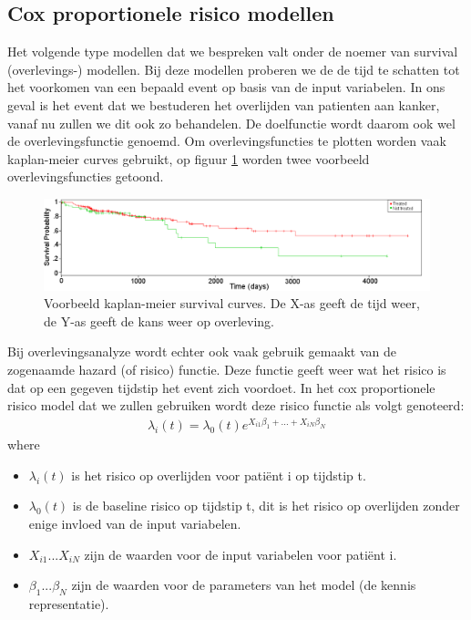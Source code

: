 \begin{abstract*}
\subsection{Cox proportionele risico modellen}
Het volgende type modellen dat we bespreken valt onder de noemer van survival (overlevings-) modellen. Bij deze modellen proberen we de de tijd te schatten tot het voorkomen van een bepaald event op basis van de input variabelen. In ons geval is het event dat we bestuderen het overlijden van patienten aan kanker, vanaf nu zullen we dit ook zo behandelen. De doelfunctie wordt daarom ook wel de overlevingsfunctie genoemd. Om overlevingsfuncties te plotten worden vaak kaplan-meier curves gebruikt, op figuur \ref{fig:D:cox-example-kaplan-meier} worden twee voorbeeld overlevingsfuncties getoond.	
\begin{figure}
	\centering
	\includegraphics[scale=0.4]{images/example_kaplan_meier_curve}
	\caption{Voorbeeld kaplan-meier survival curves. De X-as geeft de tijd weer, de Y-as geeft de kans weer op overleving.}
	\label{fig:D:cox-example-kaplan-meier}
\end{figure}
Bij overlevingsanalyze wordt echter ook vaak gebruik gemaakt van de zogenaamde hazard (of risico) functie. Deze functie geeft weer wat het risico is dat op een gegeven tijdstip het event zich voordoet. In het cox proportionele risico model dat we zullen gebruiken wordt deze risico functie als volgt genoteerd:
\begin{equation}
\begin{split}
\lambda_{i}(t) = \lambda_{0}(t)e^{X_{i1}\beta_{1} + ... + X_{iN}\beta_{N}}
\end{split}
\end{equation}
where
\begin{itemize}
	\item $\lambda_{i}(t)$ is het risico op overlijden voor pati\"ent i op tijdstip t.
	\item $\lambda_{0}(t)$ is de baseline risico op tijdstip t, dit is het risico op overlijden zonder enige invloed van de input variabelen.
	\item $X_{i1} ... X_{iN}$ zijn de waarden voor de input variabelen voor pati\"ent i.
	\item $\beta_{1} ... \beta_{N}$ zijn de waarden voor de parameters van het model (de kennis representatie).

\end{itemize}
\end{abstract*}
